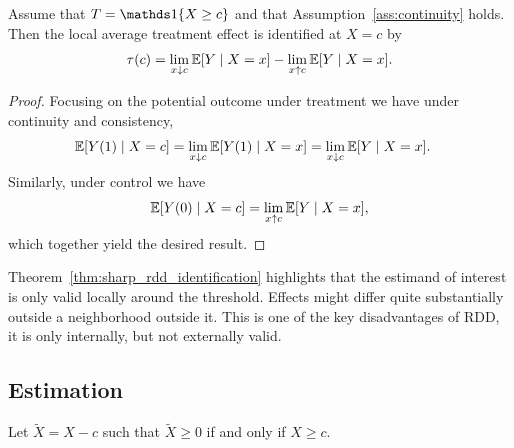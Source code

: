 \documentclass[11pt]{exam}
\begin{document}
\begin{theorem}\label{thm:sharp_rdd_identification}
    Assume that $T = \indicator{X \geq c}$ and that Assumption~\ref{ass:continuity} holds. Then the local average treatment effect is identified at $X = c$ by
    \[
    \tau(c) = \lim_{x \downarrow c} \mathbb{E}[Y \mid X = x] - \lim_{x \uparrow c} \mathbb{E}[Y \mid X = x].
    \]
\end{theorem}

\begin{proof}
    Focusing on the potential outcome under treatment we have under continuity and consistency,
    \begin{align*}
        \mathbb{E}[Y(1) \mid X = c] &=  \lim_{x \downarrow c} \mathbb{E}[Y(1) \mid X = x] = \lim_{x \downarrow c} \mathbb{E}[Y \mid X = x].
    \end{align*}
    Similarly, under control we have 
    \[
    \mathbb{E}[Y(0) \mid X = c] = \lim_{x \uparrow c} \mathbb{E}[Y \mid X = x],
    \]
    which together yield the desired result.
\end{proof}
Theorem~\ref{thm:sharp_rdd_identification} highlights that the estimand of interest is only valid locally around the threshold. Effects might differ quite substantially outside a neighborhood outside it. This is one of the key disadvantages of RDD, it is only internally, but not externally valid.

\subsection{Estimation}
Let $\tilde X = X - c$ such that $\tilde X \geq 0$ if and only if $X \geq c$.  
\end{document}
